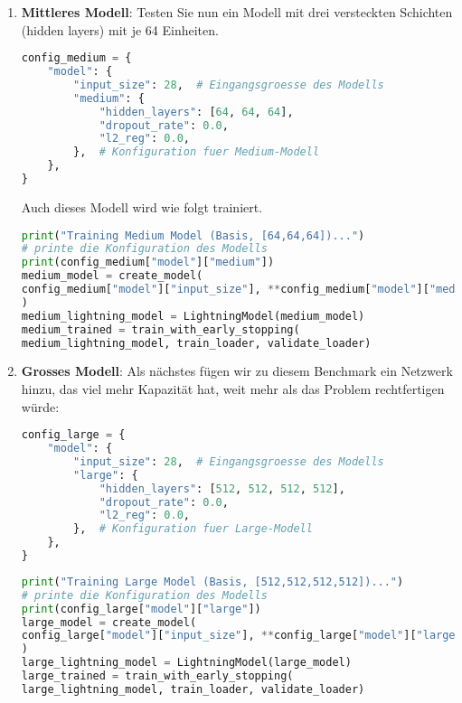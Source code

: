 \documentclass[11pt,a4paper,headinclude]{scrartcl}
\begin{document}
\begin{Aufgabe}
\begin{enumerate}
		
		
\item \textbf{Mittleres Modell}: Testen Sie nun ein Modell mit drei versteckten Schichten (hidden layers) mit je 64 Einheiten.
		
\begin{lstlisting}[language=Python]
config_medium = {
	"model": {
		"input_size": 28,  # Eingangsgroesse des Modells
		"medium": {
			"hidden_layers": [64, 64, 64],
			"dropout_rate": 0.0,
			"l2_reg": 0.0,
		},  # Konfiguration fuer Medium-Modell
	},
}
\end{lstlisting}
		
Auch dieses Modell wird wie folgt trainiert.
\begin{lstlisting}[language=Python]
print("Training Medium Model (Basis, [64,64,64])...")
# printe die Konfiguration des Modells
print(config_medium["model"]["medium"])
medium_model = create_model(
config_medium["model"]["input_size"], **config_medium["model"]["medium"]
)
medium_lightning_model = LightningModel(medium_model)
medium_trained = train_with_early_stopping(
medium_lightning_model, train_loader, validate_loader)
\end{lstlisting}
		
		
\item \textbf{Grosses Modell}: Als nächstes fügen wir zu diesem Benchmark ein Netzwerk hinzu, das viel mehr Kapazität hat, weit mehr als das Problem rechtfertigen würde:
		
\begin{lstlisting}[language=Python]
config_large = {
	"model": {
		"input_size": 28,  # Eingangsgroesse des Modells
		"large": {
			"hidden_layers": [512, 512, 512, 512],
			"dropout_rate": 0.0,
			"l2_reg": 0.0,
		},  # Konfiguration fuer Large-Modell
	},
}
\end{lstlisting}
		
\begin{lstlisting}[language=Python]
print("Training Large Model (Basis, [512,512,512,512])...")
# printe die Konfiguration des Modells
print(config_large["model"]["large"])
large_model = create_model(
config_large["model"]["input_size"], **config_large["model"]["large"]
)
large_lightning_model = LightningModel(large_model)
large_trained = train_with_early_stopping(
large_lightning_model, train_loader, validate_loader)
\end{lstlisting}
		

\end{enumerate}
\end{Aufgabe}
\end{document}
